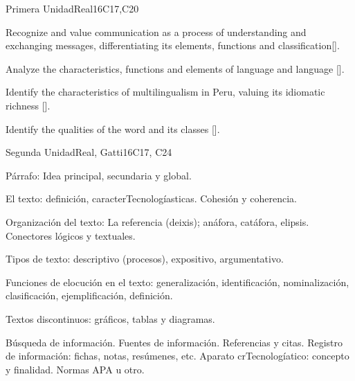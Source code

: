 \begin{syllabus}
\begin{unit}{}{Primera Unidad}{Real}{16}{C17,C20}
\begin{learningoutcomes}
   \item Recognize and value communication as a process of understanding and exchanging messages, differentiating its elements, functions and classification[\Usage].
   \item Analyze the characteristics, functions and elements of language and language [\Usage].
   \item Identify the characteristics of multilingualism in Peru, valuing its idiomatic richness [\Usage].
   \item Identify the qualities of the word and its classes [\Usage].
\end{learningoutcomes}
\end{unit}

\begin{unit}{}{Segunda Unidad}{Real, Gatti}{16}{C17, C24}
\begin{topics}
   \item Párrafo: Idea principal, secundaria y global.
   \item El texto: definición, caracterTecnologíasticas. Cohesión y coherencia.
   \item Organización del texto: La referencia (deixis); anáfora, catáfora, elipsis. Conectores lógicos y textuales.
   \item Tipos de texto: descriptivo (procesos), expositivo, argumentativo.
   \item Funciones de elocución en el texto: generalización, identificación, nominalización, clasificación,  ejemplificación, definición.
   \item Textos discontinuos: gráficos, tablas y diagramas.
   \item Búsqueda de información. Fuentes de información. Referencias y citas. Registro de información: fichas, notas, resúmenes, etc. Aparato crTecnologíatico: concepto y finalidad. Normas APA u otro.


\end{topics}
\end{unit}
\end{syllabus}
